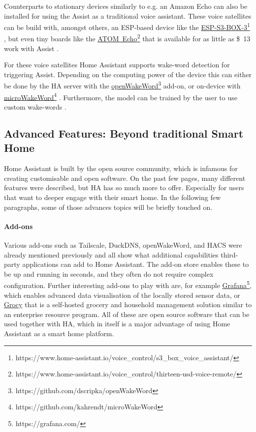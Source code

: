 Counterparts to stationary devices similarly to e.g. an Amazon Echo can also be installed for using the Assist as a traditional voice assistant. These voice satellites can be build with, amongst others, an ESP-based device \cite{HomeAssistant_VoiceControl} like the \href{https://www.home-assistant.io/voice_control/s3_box_voice_assistant/}{ESP-S3-BOX-3}\footnote{https://www.home-assistant.io/voice\_control/s3\_box\_voice\_assistant/} \cite{HomeAssistant_Assist_S3Box}, but even tiny boards like the \href{https://www.home-assistant.io/voice_control/thirteen-usd-voice-remote/}{ATOM~Echo}\footnote{https://www.home-assistant.io/voice\_control/thirteen-usd-voice-remote/} that is available for as little as \$~13 work with Assist \cite{HomeAssistant_Assist_AtomEcho}.

For these voice satellites Home Assistant supports wake-word detection for triggering Assist. Depending on the computing power of the device this can either be done by the HA server with the \href{https://github.com/dscripka/openWakeWord}{openWakeWord}\footnote{https://github.com/dscripka/openWakeWord} add-on, or on-device with \href{https://github.com/kahrendt/microWakeWord}{microWakeWord}\footnote{https://github.com/kahrendt/microWakeWord} \cite{HomeAssistant_WakeWord}. Furthermore, the model can be trained by the user to use custom wake-words \cite{HomeAssistant_CustomWakeWord}.

\subsection{Advanced Features: Beyond traditional Smart Home}

Home Assistant is built by the open source community, which is infamous for creating customisable and open software. On the past few pages, many different features were described, but HA has so much more to offer. Especially for users that want to deeper engage with their smart home. In the following few paragraphs, some of those advances topics will be briefly touched on.

\paragraph{Add-ons}
\label{sec:ha-addons}
Various add-ons such as Tailscale, DuckDNS, openWakeWord, and HACS were already mentioned previously and all show what additional capabilities third-party applications can add to Home Assistant. The add-on store enables these to be up and running in seconds, and they often do not require complex configuration. Further interesting add-ons to play with are, for example \href{https://grafana.com/}{Grafana}\footnote{https://grafana.com/}, which enables advanced data visualisation of the locally stored sensor data, or \href{https://grocy.info/}{Grocy} that is a self-hosted grocery and household management solution similar to an enterprise resource program. All of these are open source software that can be used together with HA, which in itself is a major advantage of using Home Assistant as a smart home platform.

